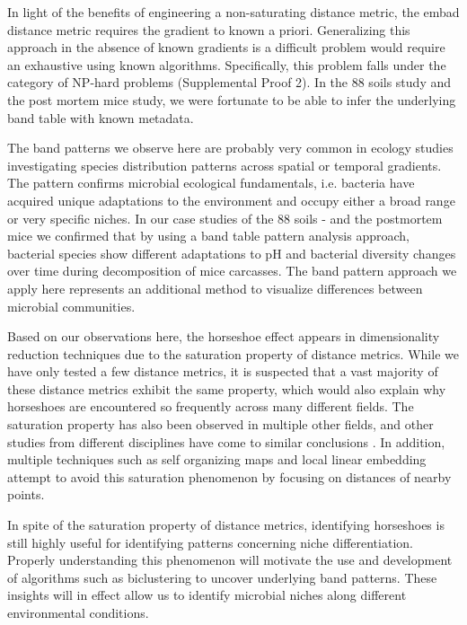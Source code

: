 In light of the benefits of engineering a non-saturating distance metric, the \gls{embad} distance metric requires the gradient to known a priori.  Generalizing this approach in the absence of known gradients is a difficult problem would require an exhaustive using known algorithms.  Specifically, this problem falls under the category of NP-hard problems (Supplemental Proof 2).  In the 88 soils study and the post mortem mice study, we were fortunate to be able to infer the underlying band table with known metadata.  \par
The band patterns we observe here are probably very common in ecology studies investigating species distribution patterns across spatial or temporal gradients. The pattern confirms microbial ecological fundamentals, i.e. bacteria have acquired unique adaptations to the environment and occupy either a broad range or very specific niches. In our case studies of the 88 soils - and the postmortem mice we confirmed that by using a band table pattern analysis approach, bacterial species show different adaptations to pH and bacterial diversity changes over time during decomposition of mice carcasses. The band pattern approach we apply here represents an additional method to visualize differences between microbial communities.\par
Based on our observations here, the horseshoe effect appears in dimensionality reduction techniques due to the saturation property of distance metrics.  While we have only tested a few distance metrics, it is suspected that a vast majority of these distance metrics exhibit the same property, which would also explain why horseshoes are encountered so frequently across many different fields. The saturation property has also been observed in multiple other fields, and other studies from different disciplines have come to similar conclusions \cite{horseshoe_kernel}. In addition, multiple techniques such as self organizing maps \cite{self_organizing_maps} and local linear embedding \cite{local_linear_embedding} attempt to avoid this saturation phenomenon by focusing on distances of nearby points.\par
In spite of the saturation property of distance metrics, identifying horseshoes is still highly useful for identifying patterns concerning niche differentiation.   Properly understanding this phenomenon will motivate the use and development of algorithms such as biclustering \cite{biclustering} to uncover underlying band patterns.  These insights will in effect allow us to identify microbial niches along different environmental conditions.\par
